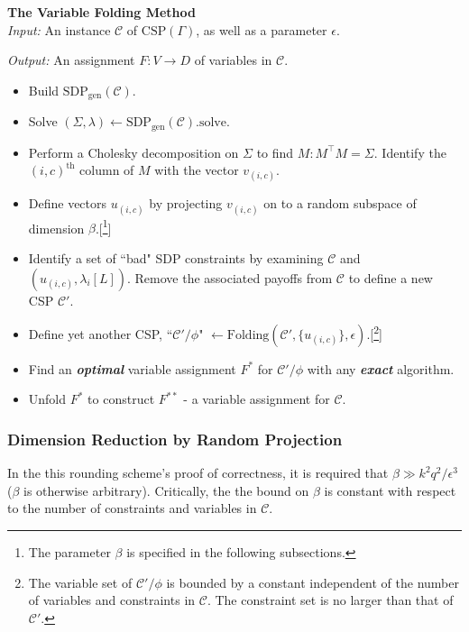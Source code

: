\begin{algorithm} \textbf{The Variable Folding Method} \\

\textit{Input: } An instance $\mathcal{C}$ of $\text{CSP}(\Gamma)$, as well as a parameter $\epsilon$.

\textit{Output: } An assignment $F : V \to D$ of variables in $\mathcal{C}$.
\begin{itemize}
\item Build $\text{SDP}_{\text{gen}}(\mathcal{C})$.
\item Solve $(\Sigma,\lambda) \leftarrow \text{SDP}_{\text{gen}}(\mathcal{C}).\text{solve}$.
\item Perform a Cholesky decomposition on $\Sigma$ to find $M : M^\intercal M = \Sigma$. Identify the $(i,c)^{\text{th}}$ column of $M$ with the vector $v_{(i,c)}$.
\item Define vectors $u_{(i,c)}$ by projecting $v_{(i,c)}$ on to a random subspace of dimension $\beta$.[\footnote{The parameter $\beta$ is specified in the following subsections.}]
\item Identify a set of ``bad" SDP constraints by examining $\mathcal{C}$ and $(u_{(i,c)},\lambda_i[L])$. Remove the associated payoffs from $\mathcal{C}$ to define a new CSP $\mathcal{C}'$.
\item Define yet another CSP, ``$\mathcal{C}'/\phi$" $\leftarrow \text{Folding}(\mathcal{C}',\{u_{(i,c)}\},\epsilon)$.[\footnote{The variable set of  $\mathcal{C}'/\phi$ is bounded by a constant independent of the number of variables and constraints in $\mathcal{C}$. The constraint set is no larger than that of $\mathcal{C}'$.}]
\item Find an \textit{\textbf{optimal}} variable assignment $F^*$ for $\mathcal{C}'/\phi$ with any \textit{\textbf{exact}} algorithm.
\item Unfold $F^*$ to construct $F^{**}$ - a variable assignment for $\mathcal{C}$.
\end{itemize}
\end{algorithm}

\subsubsection{Dimension Reduction by Random Projection}
In the this rounding scheme's proof of correctness, it is required that $ \beta \gg k^2q^2/\epsilon^3$ ($\beta$ is otherwise arbitrary). Critically, the the bound on $\beta$ is constant with respect to the number of constraints and variables in $\mathcal{C}$. 

